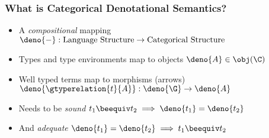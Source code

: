 \begin{frame}
    \frametitle{What is Categorical Denotational Semantics?}
    \begin{itemize}
        \setlength\itemsep{3em}
        \item A \textit{compositional} mapping $\deno{-}: \text{Language Structure} \rightarrow \text{Categorical Structure}$
        \item Types and type environments map to objects $\deno{A} \in \obj(\C)$
        \item Well typed terms map to morphisms (arrows) $\deno{\gtyperelation{t}{A}}: \deno{\G} \rightarrow \deno{A}$
        \item Needs to be \textit{sound} $t_1 \beequiv t_2 \implies \deno{t_1} = \deno{t_2}$
        \item And \textit{adequate} $\deno{t_1} = \deno{t_2} \implies t_1 \beequiv t_2$
    \end{itemize}
    

\end{frame}